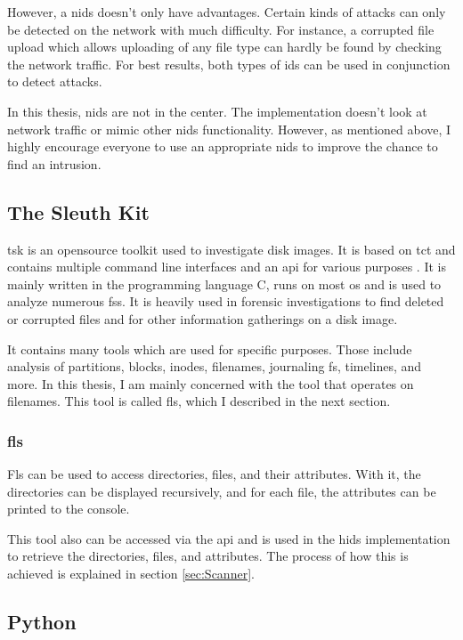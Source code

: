 However, a \gls{nids} doesn't only have advantages. Certain kinds of attacks can only be detected on the network with much difficulty. For instance, a corrupted file upload which allows uploading of any file type can hardly be found by checking the network traffic. For best results, both types of \gls{ids} can be used in conjunction to detect attacks. 

In this thesis, \gls{nids} are not in the center. The implementation doesn't look at network traffic or mimic other \gls{nids} functionality. However, as mentioned above, I highly encourage everyone to use an appropriate \gls{nids} to improve the chance to find an intrusion. 

\subsection{The Sleuth Kit}
\label{sec:tsk}

\gls{tsk} is an \gls{opensource} toolkit used to investigate disk images. It is based on \gls{tct} \cite{tct} and contains multiple command line interfaces and an \gls{api} for various purposes \cite{tsk, tsk:about}. It is mainly written in the programming language C, runs on most \gls{os} and is used to analyze numerous \glspl{fs}. It is heavily used in forensic investigations to find deleted or corrupted files and for other information gatherings on a disk image.

It contains many tools which are used for specific purposes. Those include analysis of partitions, blocks, inodes, filenames, journaling \gls{fs}, timelines, and more. In this thesis, I am mainly concerned with the tool that operates on filenames. This tool is called fls, which I described in the next section.

\subsubsection{fls}
\label{sec:fls}

Fls can be used to access directories, files, and their attributes. With it, the directories can be displayed recursively, and for each file, the attributes can be printed to the console. \cite{tsk:fls} 

This tool also can be accessed via the \gls{api} and is used in the \gls{hids} implementation to retrieve the directories, files, and attributes. The process of how this is achieved is explained in section \ref{sec:Scanner}.

\subsection{Python}
\label{sec:python}

